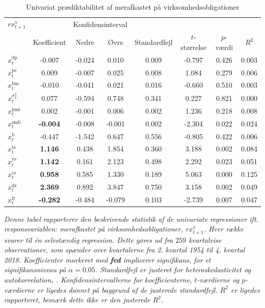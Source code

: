 \documentclass[
  a4paper,
  oneside]{memoir}
\begin{document}
\begin{table}[H]

\caption{\label{tab:UNI-v}Univariat prædiktabilitet af merafkastet på virksomhedsobligationer}
\centering
\begin{threeparttable}
\begin{tabular}[t]{lccccccc}
\toprule
\multicolumn{1}{c}{$rx_{t+1}^{\text{v}}$} & \multicolumn{1}{c}{ } & \multicolumn{2}{c}{Konfidensinterval} & \multicolumn{4}{c}{ } \\
\cmidrule(l{3pt}r{3pt}){1-1} \cmidrule(l{3pt}r{3pt}){3-4}
  & Koefficient & Nedre & Øvre & Standardfejl & $t$-størrelse & $p$-værdi & $R^2$\\
\midrule
\rowcolor{gray!6}  $x_t^{\text{dp}}$ & -0.007 & -0.024 & 0.010 & 0.009 & -0.797 & 0.426 & 0.003\\
$x_t^{\text{pe}}$ & 0.009 & -0.007 & 0.025 & 0.008 & 1.084 & 0.279 & 0.006\\
\rowcolor{gray!6}  $x_t^{\text{bm}}$ & -0.010 & -0.041 & 0.021 & 0.016 & -0.660 & 0.510 & 0.003\\
$x_t^{\sigma_{\text{a}}^2}$ & 0.077 & -0.594 & 0.748 & 0.341 & 0.227 & 0.821 & 0.000\\
\rowcolor{gray!6}  $x_t^{\text{hml}}$ & 0.002 & -0.001 & 0.006 & 0.002 & 1.236 & 0.218 & 0.008\\
$x_t^{\text{smb}}$ & \textbf{-0.004} & -0.008 & -0.001 & 0.002 & -2.304 & 0.022 & 0.024\\
\rowcolor{gray!6}  $x_t^{\text{b}}$ & -0.447 & -1.542 & 0.647 & 0.556 & -0.805 & 0.422 & 0.006\\
$x_t^{\text{ts}}$ & \textbf{ 1.146} & 0.438 & 1.854 & 0.360 & 3.188 & 0.002 & 0.084\\
\rowcolor{gray!6}  $x_t^{\text{ys}}$ & \textbf{ 1.142} & 0.161 & 2.123 & 0.498 & 2.292 & 0.023 & 0.051\\
$x_t^{\text{cs}}$ & \textbf{ 0.958} & 0.585 & 1.330 & 0.189 & 5.063 & 0.000 & 0.125\\
\rowcolor{gray!6}  $x_t^{\text{ds}}$ & \textbf{ 2.369} & 0.892 & 3.847 & 0.750 & 3.158 & 0.002 & 0.049\\
$x_t^{\text{fr}}$ & \textbf{-0.282} & -0.484 & -0.079 & 0.103 & -2.739 & 0.007 & 0.047\\
\bottomrule
\end{tabular}
\begin{tablenotes}
\item \textit{Denne tabel rapporterer den beskrivende statistik af de univariate regressioner ift. responsvariablen: merafkastet på virksomhedsobligationer, $rx_{t+1}^{\text{v}}$. Hver række svarer til én selvstændig regression. Dette gøres ud fra $259$ kvartalvise observationer, som spænder over kvartalerne fra 2. kvartal 1954 til 4. kvartal 2018. Koefficienter markeret med \textbf{fed} implicerer signifikans, for et signifikansniveau på $\alpha=0.05$. Standardfejl er justeret for heteroskedasticitet og autokorrelation, \citep{Newey1987}. Konfidensintervallerne for koefficienterne, $t$-værdierne og $p$-værdierne er ligedes dannet på baggrund af de justerede standardfejl. $R^2$ er ligedes rapporteret, bemærk dette ikke er den justerede $R^2$.}

\end{tablenotes}
\end{threeparttable}
\end{table}
\end{document}
